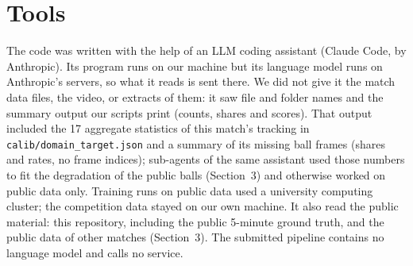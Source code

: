 \documentclass[11pt,a4paper]{article}
\newcommand{\code}[1]{\texttt{#1}}
\begin{document}
\section{Tools}

The code was written with the help of an LLM coding assistant (Claude Code, by Anthropic). Its
program runs on our machine but its language model runs on Anthropic's servers, so what it reads is
sent there. We did not give it the match data files, the video, or extracts of them: it saw file and
folder names and the summary output our scripts print (counts, shares and scores). That output
included the 17 aggregate statistics of this match's tracking in \code{calib/domain\_target.json} and
a summary of its missing ball frames (shares and rates, no frame indices); sub-agents of the same
assistant used those numbers to fit the degradation of the public balls (Section~3) and otherwise
worked on public data only. Training runs on public data used a university computing cluster; the
competition data stayed on our own machine. It also read the
public material: this repository, including the public 5-minute ground truth, and the public data of
other matches (Section~3). The submitted pipeline contains no language model and calls no service.
\end{document}
